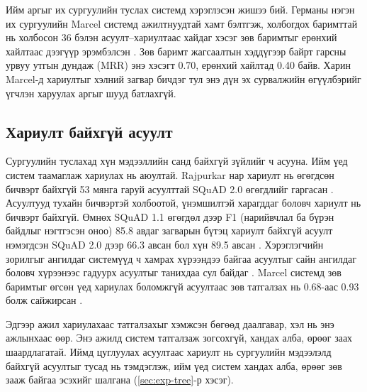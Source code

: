 Ийм аргыг их сургуулийн туслах системд хэрэглэсэн жишээ бий. Германы нэгэн их сургуулийн Marcel системд ажилтнуудтай хамт бэлтгэж, холбогдох баримттай нь холбосон 36 бэлэн асуулт–хариултаас хайдаг хэсэг зөв баримтыг ерөнхий хайлтаас дээгүүр эрэмбэлсэн \cite{trienes2025marcel}. Зөв баримт жагсаалтын хэддүгээр байрт гарсны урвуу утгын дундаж (\acs{MRR}) энэ хэсэгт 0.70, ерөнхий хайлтад 0.40 байв. Харин Marcel-д хариултыг хэлний загвар бичдэг тул энэ дүн эх сурвалжийн өгүүлбэрийг үгчлэн харуулах аргыг шууд батлахгүй.

\subsection{Хариулт байхгүй асуулт}
\label{sec:lit-unanswerable}

Сургуулийн туслахад хүн мэдээллийн санд байхгүй зүйлийг ч асууна. Ийм үед систем таамаглаж хариулах нь аюултай. Rajpurkar нар хариулт нь өгөгдсөн бичвэрт байхгүй 53 мянга гаруй асуулттай SQuAD 2.0 өгөгдлийг гаргасан \cite{rajpurkar2018squad2}. Асуултууд тухайн бичвэртэй холбоотой, үнэмшилтэй харагддаг боловч хариулт нь бичвэрт байхгүй. Өмнөх SQuAD 1.1 өгөгдөл дээр F1 (нарийвчлал ба бүрэн байдлыг нэгтгэсэн оноо) 85.8 авдаг загварын бүтэц хариулт байхгүй асуулт нэмэгдсэн SQuAD 2.0 дээр 66.3 авсан бол хүн 89.5 авсан \cite{rajpurkar2018squad2}. Хэрэглэгчийн зорилгыг ангилдаг системүүд ч хамрах хүрээндээ байгаа асуултыг сайн ангилдаг боловч хүрээнээс гадуурх асуултыг танихдаа сул байдаг \cite{larson2019clinc}. Marcel системд зөв баримтыг өгсөн үед хариулах боломжгүй асуултаас зөв татгалзах нь 0.68-аас 0.93 болж сайжирсан \cite{trienes2025marcel}.

Эдгээр ажил хариулахаас татгалзахыг хэмжсэн бөгөөд даалгавар, хэл нь энэ ажлынхаас өөр. Энэ ажилд систем татгалзаж зогсохгүй, хандах алба, өрөөг заах шаардлагатай. Иймд цуглуулах асуултаас хариулт нь сургуулийн мэдээлэлд байхгүй асуултыг тусад нь тэмдэглэж, ийм үед систем хандах алба, өрөөг зөв зааж байгаа эсэхийг шалгана (\ref{sec:exp-tree}-р хэсэг).
